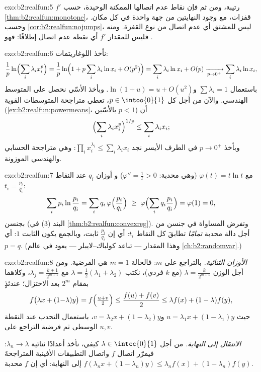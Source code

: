\begin{solution}{exo:b2:realfun:5}
$f'$ رتيبة، ومن ثم فإن نقاط عدم اتصالها الممكنة الوحيدة، حسب \cref{thm:b2:realfun:monotone}،
قفزات، مع وجود النهايتين من جهة واحدة
في كل مكان. وحسب \cref{cor:b2:realfun:nojumps}، ليس للمشتق أي
عدم اتصال من نوع القفزة. ومنه فليس للمقدار $f'$ أي نقطة عدم اتصال إطلاقًا:
فهو .
\end{solution}

\begin{solution}{exo:b2:realfun:6}
نأخذ اللوغاريتمات:
\[
\frac1p \ln\Bigl(\sum_i \lambda_i x_i^p\Bigr)
= \frac1p \ln\Bigl(1 + p\sum_i \lambda_i \ln x_i +
O(p^2)\Bigr)
= \sum_i \lambda_i \ln x_i + O(p)
\xrightarrow[p \to 0^+]{} \sum_i \lambda_i \ln x_i ,
\]
باستعمال $\sum\lambda_i = 1$ و$\ln(1 + u) = u + O(u^2)$.
وبأخذ الأسّي نحصل على المتوسط الهندسي. والآن من أجل كل $p \in
\intoo{0}{1}$، تعطي متراجحة المتوسطات القوية
(\cref{ex:b2:realfun:powermeans}، بالأسّين $p < 1$) أن
\[
\Bigl(\sum_i \lambda_i x_i^p\Bigr)^{1/p} \leq \sum_i\lambda_i x_i ;
\]
وبأخذ $p \to 0^+$ في الطرف الأيسر نجد $\prod_i x_i^{\lambda_i}
\leq \sum_i \lambda_i x_i$: وهي متراجحة الحسابي والهندسي الموزونة.
\end{solution}

\begin{solution}{exo:b2:realfun:7}
مع $\varphi(t) = t\ln t$ (وهي محدبة: $\varphi'' = \frac1t > 0$) و
أوزان $q_i$ عند النقاط $t_i = \frac{p_i}{q_i}$:
\[
\sum_i p_i \ln\frac{p_i}{q_i}
= \sum_i q_i\, \varphi\Bigl(\frac{p_i}{q_i}\Bigr)
\;\geq\; \varphi\Bigl(\sum_i q_i \frac{p_i}{q_i}\Bigr)
= \varphi(1) = 0 ,
\]
بجنسن (البند (3) في \cref{thm:b2:realfun:convexreg}). وتفرض المساواة في
جنسن من أجل دالة محدبة \emph{تمامًا} تطابقَ كل النقاط
$t_i$: أي إن $\frac{p_i}{q_i}$ ثابت، وبالجمع يكون
الثابت $1$: أي $p = q$. (وهذا المقدار --- تباعد كولباك--لايبلر ---
يعود في عالم \cref{ch:b2:randomvar}.)
\end{solution}

\begin{solution}{exo:b2:realfun:8}
\emph{الأوزان الثنائية.} بالتراجع على $m$: فالحالة $m = 1$ هي
الفرضية. ومن أجل الوزن $\lambda = \frac{k}{2^{m+1}}$ (مع $k$ فردي)،
نكتب $\lambda = \frac12(\lambda_1 + \lambda_2)$ مع $\lambda_j =
\frac{k \mp 1}{2^{m+1}}$، وكلاهما بمقام $2^m$ بعد
الاختزال؛ عندئذٍ
\[
f\bigl(\lambda x + (1{-}\lambda)y\bigr)
= f\Bigl(\tfrac{u + v}{2}\Bigr)
\leq \frac{f(u) + f(v)}{2}
\leq \lambda f(x) + (1 - \lambda) f(y),
\]
حيث $u = \lambda_1 x + (1 - \lambda_1)y$ و$v = \lambda_2 x +
(1-\lambda_2)y$، باستعمال التحدب عند النقطة الوسطى ثم فرضية
التراجع على $u, v$.

\emph{الانتقال إلى النهاية.} من أجل $\lambda \in
\intcc{0}{1}$ كيفي، نأخذ أعدادًا ثنائية $\lambda_n \to \lambda$: فيمرّر اتصال
$f$ واتصال التطبيقات الأفينية المتراجحةَ
$f(\lambda_n x + (1-\lambda_n)y) \leq \lambda_n f(x) +
(1-\lambda_n)f(y)$ إلى النهاية: أي إن $f$ محدبة.
\end{solution}

